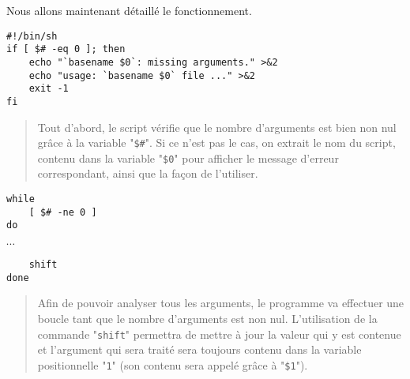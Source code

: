 Nous allons maintenant d{\'e}taill{\'e} le fonctionnement.

\begin{verbatim}
#!/bin/sh
if [ $# -eq 0 ]; then
    echo "`basename $0`: missing arguments." >&2
    echo "usage: `basename $0` file ..." >&2
    exit -1
fi
\end{verbatim}
\begin{quote}

Tout d'abord, le script v{\'e}rifie que le nombre d'arguments est bien non nul gr{\^a}ce
{\`a} la variable "\verb,$#,". Si ce n'est pas le cas, on extrait le nom du
script, contenu dans la variable "\verb,$0," pour afficher le message d'erreur
correspondant, ainsi que la fa\c{c}on de l'utiliser.
\end{quote}

\begin{verbatim}
while
    [ $# -ne 0 ]
do
\end{verbatim}
\vspace{2ex}
$\cdots$
\\[2ex]
\begin{verbatim}
    shift
done
\end{verbatim}
\begin{quote}
Afin de pouvoir analyser tous les arguments, le programme va effectuer une boucle
tant que le nombre d'arguments est non nul. L'utilisation de la commande "{\tt shift}"
permettra de mettre {\`a} jour la valeur qui y est contenue et l'argument qui sera trait{\'e} sera
toujours contenu dans la variable positionnelle "{\tt 1}" (son contenu sera appel{\'e} gr{\^a}ce
{\`a} "\verb=$1="). 
\end{quote}


